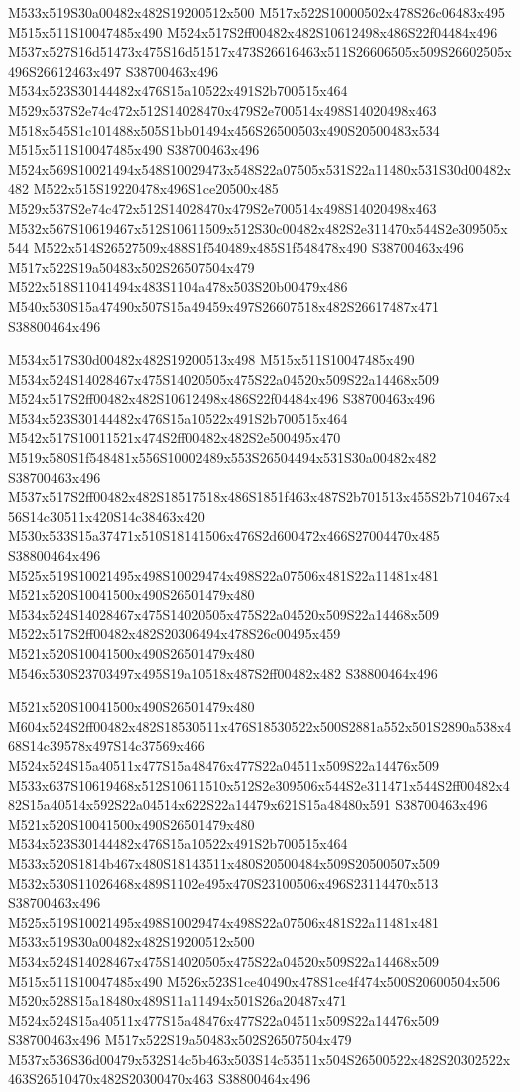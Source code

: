 \documentclass{article}
\begin{document}
\begin{multicols}{2}
M533x519S30a00482x482S19200512x500 M517x522S10000502x478S26c06483x495 M515x511S10047485x490 M524x517S2ff00482x482S10612498x486S22f04484x496 M537x527S16d51473x475S16d51517x473S26616463x511S26606505x509S26602505x496S26612463x497 S38700463x496 M534x523S30144482x476S15a10522x491S2b700515x464 M529x537S2e74c472x512S14028470x479S2e700514x498S14020498x463 M518x545S1c101488x505S1bb01494x456S26500503x490S20500483x534 M515x511S10047485x490 S38700463x496 M524x569S10021494x548S10029473x548S22a07505x531S22a11480x531S30d00482x482 M522x515S19220478x496S1ce20500x485 M529x537S2e74c472x512S14028470x479S2e700514x498S14020498x463 M532x567S10619467x512S10611509x512S30c00482x482S2e311470x544S2e309505x544 M522x514S26527509x488S1f540489x485S1f548478x490 S38700463x496 M517x522S19a50483x502S26507504x479 M522x518S11041494x483S1104a478x503S20b00479x486 M540x530S15a47490x507S15a49459x497S26607518x482S26617487x471 S38800464x496

M534x517S30d00482x482S19200513x498 M515x511S10047485x490 M534x524S14028467x475S14020505x475S22a04520x509S22a14468x509 M524x517S2ff00482x482S10612498x486S22f04484x496 S38700463x496 M534x523S30144482x476S15a10522x491S2b700515x464 M542x517S10011521x474S2ff00482x482S2e500495x470 M519x580S1f548481x556S10002489x553S26504494x531S30a00482x482 S38700463x496 M537x517S2ff00482x482S18517518x486S1851f463x487S2b701513x455S2b710467x456S14c30511x420S14c38463x420 M530x533S15a37471x510S18141506x476S2d600472x466S27004470x485 S38800464x496 M525x519S10021495x498S10029474x498S22a07506x481S22a11481x481 M521x520S10041500x490S26501479x480 M534x524S14028467x475S14020505x475S22a04520x509S22a14468x509 M522x517S2ff00482x482S20306494x478S26c00495x459 M521x520S10041500x490S26501479x480 M546x530S23703497x495S19a10518x487S2ff00482x482 S38800464x496

M521x520S10041500x490S26501479x480 M604x524S2ff00482x482S18530511x476S18530522x500S2881a552x501S2890a538x468S14c39578x497S14c37569x466 M524x524S15a40511x477S15a48476x477S22a04511x509S22a14476x509 M533x637S10619468x512S10611510x512S2e309506x544S2e311471x544S2ff00482x482S15a40514x592S22a04514x622S22a14479x621S15a48480x591 S38700463x496 M521x520S10041500x490S26501479x480 M534x523S30144482x476S15a10522x491S2b700515x464 M533x520S1814b467x480S18143511x480S20500484x509S20500507x509 M532x530S11026468x489S1102e495x470S23100506x496S23114470x513 S38700463x496 M525x519S10021495x498S10029474x498S22a07506x481S22a11481x481 M533x519S30a00482x482S19200512x500 M534x524S14028467x475S14020505x475S22a04520x509S22a14468x509 M515x511S10047485x490 M526x523S1ce40490x478S1ce4f474x500S20600504x506 M520x528S15a18480x489S11a11494x501S26a20487x471 M524x524S15a40511x477S15a48476x477S22a04511x509S22a14476x509 S38700463x496 M517x522S19a50483x502S26507504x479 M537x536S36d00479x532S14c5b463x503S14c53511x504S26500522x482S20302522x463S26510470x482S20300470x463 S38800464x496


\end{multicols}
\end{document}

